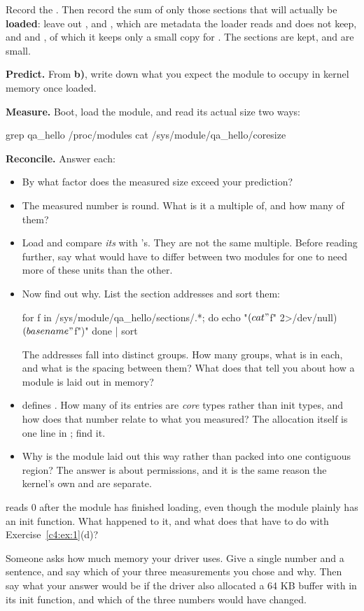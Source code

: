 \noindent Record the . Then record the sum of only those sections that will actually be
\textbf{loaded}: leave out ,  and , which are
metadata the loader reads and does not keep, and  and , of which it
keeps only a small copy for . The  sections are kept, and are
small.

 \textbf{Predict.} From \textbf{b)}, write down what you expect the module to occupy in
kernel memory once loaded.

 \textbf{Measure.} Boot, load the module, and read its actual size two ways:

\begin{shell}
grep qa_hello /proc/modules
cat /sys/module/qa_hello/coresize
\end{shell}

 \textbf{Reconcile.} Answer each:
\begin{itemize}
  \item By what factor does the measured size exceed your prediction?
  \item The measured number is round. What is it a multiple of, and how many of them?
  \item Load  and compare \emph{its}  with 's. They
    are not the same multiple. Before reading further, say what would have to differ between two
    modules for one to need more of these units than the other.
  \item Now find out why. List the section addresses and sort them:
\begin{shell}
for f in /sys/module/qa_hello/sections/.*; do
    echo "$(cat "$f" 2>/dev/null) $(basename "$f")"
done | sort
\end{shell}

    The addresses fall into distinct groups. How many groups, what is in each, and what is the
    spacing between them? What does that tell you about how a module is laid out in memory?
  \item {} defines . How many of its entries are
    \emph{core} types rather than init types, and how does that number relate to what you measured?
    The allocation itself is one line in ; find it.
  \item Why is the module laid out this way rather than packed into one contiguous region? The
    answer is about permissions, and it is the same reason the kernel's own  and
     are separate.
\end{itemize}

  reads 0 after the module has finished loading, even
though the module plainly has an init function. What happened to it, and what does that have to do
with Exercise~\ref{c4:ex:1}(d)?

 Someone asks how much memory your driver uses. Give a single number and a sentence, and
say which of your three measurements you chose and why. Then say what your answer would be if the
driver also allocated a 64 KB buffer with  in its init function, and which of the
three numbers would have changed.
